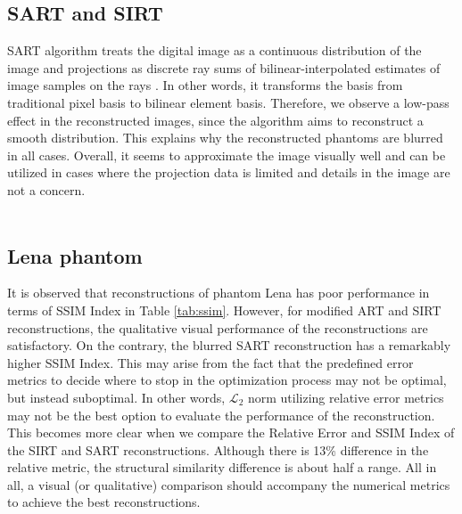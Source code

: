 \documentclass[journal]{IEEEtran}
\begin{document}
\subsection{SART and SIRT}
SART algorithm treats the digital image as a continuous distribution of the image and projections as discrete ray sums of bilinear-interpolated estimates of image samples on the rays \cite*{andersen1984sart}. In other words, it transforms the basis from traditional pixel basis to bilinear element basis. Therefore, we observe a low-pass effect in the reconstructed images, since the algorithm aims to reconstruct a smooth distribution. This explains why the reconstructed phantoms are blurred in all cases. Overall, it seems to approximate the image visually well and can be utilized in cases where the projection data is limited and details in the image are not a concern.
\\
\\
\subsection{Lena phantom}
It is observed that reconstructions of phantom Lena has poor performance in terms of SSIM Index in Table \ref*{tab:ssim}. However, for modified ART and SIRT reconstructions, the qualitative visual performance of the reconstructions are satisfactory. On the contrary, the blurred SART reconstruction has a remarkably higher SSIM Index. This may arise from the fact that the predefined error metrics to decide where to stop in the optimization process may not be optimal, but instead suboptimal. In other words, $\mathcal{L_2}$ norm utilizing relative error metrics may not be the best option to evaluate the performance of the reconstruction. This becomes more clear when we compare the Relative Error and SSIM Index of the SIRT and SART reconstructions. Although there is 13\% difference in the relative metric, the structural similarity difference is about half a range. All in all, a visual (or qualitative) comparison should accompany the numerical metrics to achieve the best reconstructions.  
\newpage
\printbibliography
\end{document}
